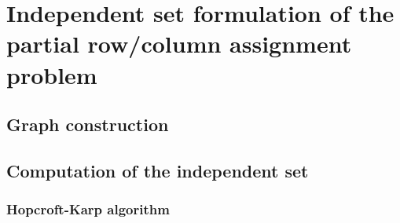 \chapter{Independent set formulation of the partial row/column assignment problem} \label{chap:independent_set}
\section{Graph construction}
\section{Computation of the independent set}
\subsection{Hopcroft-Karp algorithm}

